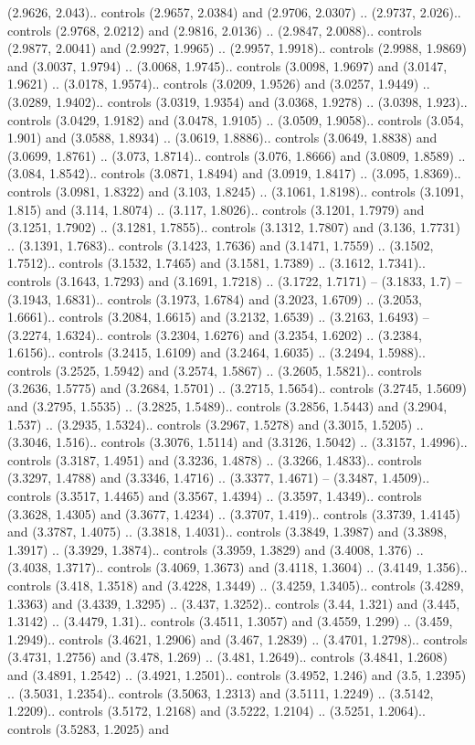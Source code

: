 (2.9626, 2.043).. controls (2.9657, 2.0384) and (2.9706, 2.0307) .. (2.9737, 2.026).. controls (2.9768, 2.0212) and (2.9816, 2.0136) .. (2.9847, 2.0088).. controls (2.9877, 2.0041) and (2.9927, 1.9965) .. (2.9957, 1.9918).. controls (2.9988, 1.9869) and (3.0037, 1.9794) .. (3.0068, 1.9745).. controls (3.0098, 1.9697) and (3.0147, 1.9621) .. (3.0178, 1.9574).. controls (3.0209, 1.9526) and (3.0257, 1.9449) .. (3.0289, 1.9402).. controls (3.0319, 1.9354) and (3.0368, 1.9278) .. (3.0398, 1.923).. controls (3.0429, 1.9182) and (3.0478, 1.9105) .. (3.0509, 1.9058).. controls (3.054, 1.901) and (3.0588, 1.8934) .. (3.0619, 1.8886).. controls (3.0649, 1.8838) and (3.0699, 1.8761) .. (3.073, 1.8714).. controls (3.076, 1.8666) and (3.0809, 1.8589) .. (3.084, 1.8542).. controls (3.0871, 1.8494) and (3.0919, 1.8417) .. (3.095, 1.8369).. controls (3.0981, 1.8322) and (3.103, 1.8245) .. (3.1061, 1.8198).. controls (3.1091, 1.815) and (3.114, 1.8074) .. (3.117, 1.8026).. controls (3.1201, 1.7979) and (3.1251, 1.7902) .. (3.1281, 1.7855).. controls (3.1312, 1.7807) and (3.136, 1.7731) .. (3.1391, 1.7683).. controls (3.1423, 1.7636) and (3.1471, 1.7559) .. (3.1502, 1.7512).. controls (3.1532, 1.7465) and (3.1581, 1.7389) .. (3.1612, 1.7341).. controls (3.1643, 1.7293) and (3.1691, 1.7218) .. (3.1722, 1.7171) -- (3.1833, 1.7) -- (3.1943, 1.6831).. controls (3.1973, 1.6784) and (3.2023, 1.6709) .. (3.2053, 1.6661).. controls (3.2084, 1.6615) and (3.2132, 1.6539) .. (3.2163, 1.6493) -- (3.2274, 1.6324).. controls (3.2304, 1.6276) and (3.2354, 1.6202) .. (3.2384, 1.6156).. controls (3.2415, 1.6109) and (3.2464, 1.6035) .. (3.2494, 1.5988).. controls (3.2525, 1.5942) and (3.2574, 1.5867) .. (3.2605, 1.5821).. controls (3.2636, 1.5775) and (3.2684, 1.5701) .. (3.2715, 1.5654).. controls (3.2745, 1.5609) and (3.2795, 1.5535) .. (3.2825, 1.5489).. controls (3.2856, 1.5443) and (3.2904, 1.537) .. (3.2935, 1.5324).. controls (3.2967, 1.5278) and (3.3015, 1.5205) .. (3.3046, 1.516).. controls (3.3076, 1.5114) and (3.3126, 1.5042) .. (3.3157, 1.4996).. controls (3.3187, 1.4951) and (3.3236, 1.4878) .. (3.3266, 1.4833).. controls (3.3297, 1.4788) and (3.3346, 1.4716) .. (3.3377, 1.4671) -- (3.3487, 1.4509).. controls (3.3517, 1.4465) and (3.3567, 1.4394) .. (3.3597, 1.4349).. controls (3.3628, 1.4305) and (3.3677, 1.4234) .. (3.3707, 1.419).. controls (3.3739, 1.4145) and (3.3787, 1.4075) .. (3.3818, 1.4031).. controls (3.3849, 1.3987) and (3.3898, 1.3917) .. (3.3929, 1.3874).. controls (3.3959, 1.3829) and (3.4008, 1.376) .. (3.4038, 1.3717).. controls (3.4069, 1.3673) and (3.4118, 1.3604) .. (3.4149, 1.356).. controls (3.418, 1.3518) and (3.4228, 1.3449) .. (3.4259, 1.3405).. controls (3.4289, 1.3363) and (3.4339, 1.3295) .. (3.437, 1.3252).. controls (3.44, 1.321) and (3.445, 1.3142) .. (3.4479, 1.31).. controls (3.4511, 1.3057) and (3.4559, 1.299) .. (3.459, 1.2949).. controls (3.4621, 1.2906) and (3.467, 1.2839) .. (3.4701, 1.2798).. controls (3.4731, 1.2756) and (3.478, 1.269) .. (3.481, 1.2649).. controls (3.4841, 1.2608) and (3.4891, 1.2542) .. (3.4921, 1.2501).. controls (3.4952, 1.246) and (3.5, 1.2395) .. (3.5031, 1.2354).. controls (3.5063, 1.2313) and (3.5111, 1.2249) .. (3.5142, 1.2209).. controls (3.5172, 1.2168) and (3.5222, 1.2104) .. (3.5251, 1.2064).. controls (3.5283, 1.2025) and 